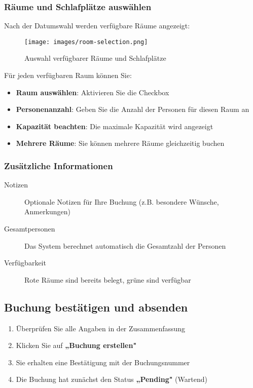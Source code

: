 \subsubsection{Räume und Schlafplätze auswählen}

Nach der Datumswahl werden verfügbare Räume angezeigt:

\begin{figure}[H]
    \centering
    \texttt{[image: images/room-selection.png]}
    \caption{Auswahl verfügbarer Räume und Schlafplätze}
    \label{fig:room-selection}
\end{figure}

Für jeden verfügbaren Raum können Sie:

\begin{itemize}
    \item \textbf{Raum auswählen}: Aktivieren Sie die Checkbox
    \item \textbf{Personenanzahl}: Geben Sie die Anzahl der Personen für diesen Raum an
    \item \textbf{Kapazität beachten}: Die maximale Kapazität wird angezeigt
    \item \textbf{Mehrere Räume}: Sie können mehrere Räume gleichzeitig buchen
\end{itemize}

\subsubsection{Zusätzliche Informationen}

\begin{description}
    \item[Notizen] Optionale Notizen für Ihre Buchung (z.B. besondere Wünsche, Anmerkungen)
    \item[Gesamtpersonen] Das System berechnet automatisch die Gesamtzahl der Personen
    \item[Verfügbarkeit] Rote Räume sind bereits belegt, grüne sind verfügbar
\end{description}

\subsection{Buchung bestätigen und absenden}

\begin{enumerate}
    \item Überprüfen Sie alle Angaben in der Zusammenfassung
    \item Klicken Sie auf \textbf{„Buchung erstellen"}
    \item Sie erhalten eine Bestätigung mit der Buchungsnummer
    \item Die Buchung hat zunächst den Status \textbf{„Pending"} (Wartend)
\end{enumerate}

